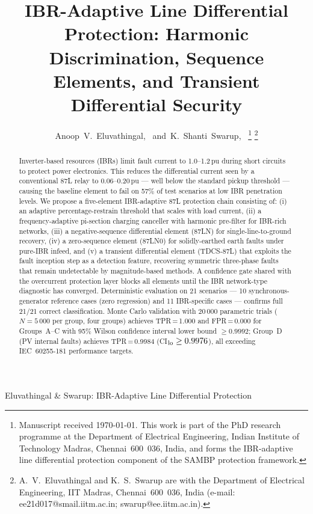 \documentclass[journal,twoside,10pt]{IEEEtran}
\begin{document}

\title{IBR-Adaptive Line Differential Protection: Harmonic Discrimination,
       Sequence Elements, and Transient Differential Security}

\author{Anoop~V.~Eluvathingal,~
        and~K.~Shanti~Swarup,~%
\thanks{Manuscript received \today.
        This work is part of the PhD research programme at the Department of
        Electrical Engineering, Indian Institute of Technology Madras,
        Chennai~600~036, India, and forms the IBR-adaptive line differential
        protection component of the SAMBP protection framework.}%
\thanks{A.~V.~Eluvathingal and K.~S.~Swarup are with the Department of
        Electrical Engineering, IIT Madras, Chennai~600~036, India
        (e-mail: ee21d017@smail.iitm.ac.in; swarup@ee.iitm.ac.in).}}

%
{Eluvathingal \& Swarup: IBR-Adaptive Line Differential Protection}

\maketitle

\begin{abstract}
Inverter-based resources (IBRs) limit fault current to 1.0--1.2\,pu during
short circuits to protect power electronics.  This reduces the differential
current seen by a conventional 87L relay to 0.06--0.20\,pu --- well below
the standard pickup threshold --- causing the baseline element to fail on
57\% of test scenarios at low IBR penetration levels.
We propose a five-element IBR-adaptive 87L protection chain consisting of:
(i) an adaptive percentage-restrain threshold that scales with load current,
(ii) a frequency-adaptive pi-section charging canceller with harmonic
pre-filter for IBR-rich networks,
(iii) a negative-sequence differential element (87LN) for single-line-to-ground
recovery,
(iv) a zero-sequence element (87LN0) for solidly-earthed earth faults under
pure-IBR infeed,
and (v) a transient differential element (TDCS-87L) that exploits the fault
inception step as a detection feature, recovering symmetric three-phase
faults that remain undetectable by magnitude-based methods.
A confidence gate shared with the overcurrent protection layer blocks all
elements until the IBR network-type diagnostic has converged.
Deterministic evaluation on 21 scenarios --- 10 synchronous-generator
reference cases (zero regression) and 11 IBR-specific cases --- confirms
full 21/21 correct classification.
Monte Carlo validation with 20\,000 parametric trials ($N=5\,000$ per
group, four groups) achieves TPR\,=\,1.000 and FPR\,=\,0.000 for Groups~A--C
with 95\% Wilson confidence interval lower bound $\geq 0.9992$; Group~D
(PV internal faults) achieves TPR\,=\,0.9984 (CI$_{\rm lo} \geq 0.9976$),
all exceeding IEC~60255-181 performance targets.
\end{abstract}
\end{document}
